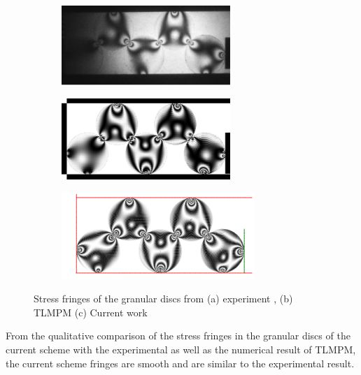 \begin{figure}[!htpb]
  \centering
  \begin{subfigure}{1.0\textwidth}
    \centering
    \includegraphics[width=0.7\textwidth]{images/csph/images/de_2021_stress_wave_in_granular_material_part_2/bardenhagen_2001}
    \subcaption{}\label{fig:de-stress-wave-bardenhagen}
  \end{subfigure}

  \begin{subfigure}{1.0\textwidth}
    \centering
    \includegraphics[width=0.7\textwidth]{images/csph/images/de_2021_stress_wave_in_granular_material_part_2/tlmpm_2021}
    \subcaption{}\label{}
  \end{subfigure}

  \begin{subfigure}{1.0\textwidth}
    \centering
    \includegraphics[width=0.8\textwidth]{figures/csph/figures/de_2021_stress_wave_in_granular_material_part_2/case_mohseni/time0}
    \subcaption{}\label{fig:de-stress-wave-current}
  \end{subfigure}
  \caption{Stress fringes of the granular discs from (a) experiment
    \parencite{guilkey2001improved}, (b) TLMPM \parencite{de2021modelling} (c) Current work}
\label{fig:de-stress-wave-compare}
\end{figure}
From the qualitative comparison of the stress fringes in the granular discs of
the current scheme with the experimental as well as the numerical result of
TLMPM, the current scheme fringes are smooth and are similar to the
experimental result.

